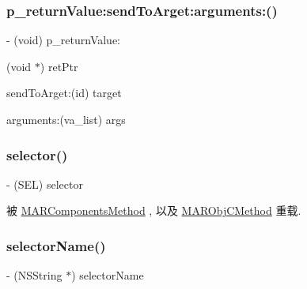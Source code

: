 \mbox{\label{interface_m_a_r_method_aef48254a78196c3b15b6ec131902637d}} 
\subsubsection{\texorpdfstring{p\+\_\+return\+Value\+:send\+To\+Arget\+:arguments\+:()}{p\_returnValue:sendToArget:arguments:()}}
{\footnotesize\ttfamily -\/ (void) p\+\_\+return\+Value\+: \begin{DoxyParamCaption}\item[{(void $\ast$)}]{ret\+Ptr }\item[{sendToArget:(id)}]{target }\item[{arguments:(va\+\_\+list)}]{args }\end{DoxyParamCaption}\hspace{0.3cm}{\ttfamily [implementation]}}

\mbox{\label{interface_m_a_r_method_a7f6933667f10c7a93cfc392cf75bb46b}} 
\subsubsection{\texorpdfstring{selector()}{selector()}}
{\footnotesize\ttfamily -\/ (S\+EL) selector \begin{DoxyParamCaption}{ }\end{DoxyParamCaption}}



被 \hyperlink{interface_m_a_r_components_method_a900cfb4b1ce47fdc3842b9e4fa9cf7ef}{M\+A\+R\+Components\+Method} , 以及 \hyperlink{interface_m_a_r_obj_c_method_ad43e6578ecf2f57ad35fea72ce6d9f7e}{M\+A\+R\+Obj\+C\+Method} 重载.

\mbox{\label{interface_m_a_r_method_a085d3384e7f4ddcf669370e7cdbd922b}} 
\subsubsection{\texorpdfstring{selector\+Name()}{selectorName()}}
{\footnotesize\ttfamily -\/ (N\+S\+String $\ast$) selector\+Name \begin{DoxyParamCaption}{ }\end{DoxyParamCaption}}

